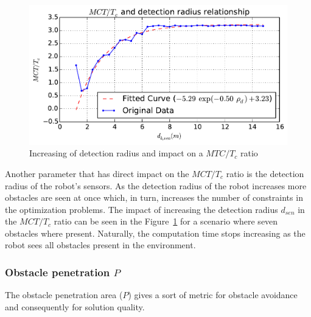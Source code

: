 \documentclass[eprint]{actapoly}
\begin{document}
\begin{figure}[!h]\centering
  \includegraphics[width=\linewidth]{./images/drho/drho-rmp.pdf} %
  \caption{Increasing of detection radius and impact on a $MTC/T_c$ 
ratio\label{fig:drhormp}}
\end{figure}
Another parameter that has direct impact on the $MCT/T_c$ ratio is the detection radius
of the robot's sensors.
As the detection radius of the robot increases more obstacles are
seen at once which, in turn,
increases the number of constraints in the optimization problems.
The impact of increasing the detection radius $d_{sen}$ in the $MCT/T_c$ ratio can
be seen in the Figure~\ref{fig:drhormp} for a scenario where seven obstacles where present.
Naturally, the computation time stops increasing as the robot sees all obstacles present
in the environment.



\subsubsection{Obstacle penetration $P$}

The obstacle penetration area ($P$) gives a sort of metric for obstacle avoidance and 
consequently for solution quality.
\end{document}
